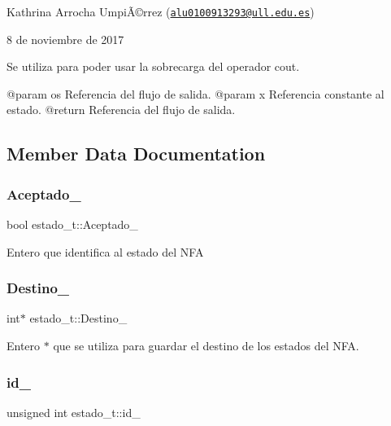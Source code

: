 Kathrina Arrocha UmpiÃ©rrez (\href{mailto:alu0100913293@ull.edu.es}{\tt alu0100913293@ull.\+edu.\+es})

8 de noviembre de 2017

Se utiliza para poder usar la sobrecarga del operador cout. \begin{DoxyVerb}  @param    os Referencia del flujo de salida. 
  @param    x Referencia constante al estado.
  @return   Referencia del flujo de salida.  \end{DoxyVerb}
 

\subsection{Member Data Documentation}
\mbox{\label{classestado__t_ada7ab9464df89cd55932c81d54a0a246}} 
\subsubsection{\texorpdfstring{Aceptado\+\_\+}{Aceptado\_}}
{\footnotesize\ttfamily bool estado\+\_\+t\+::\+Aceptado\+\_\+}

Entero que identifica al estado del N\+FA \mbox{\label{classestado__t_a2b1d0cb5028c3e687bc954c1dccb6fa5}} 
\subsubsection{\texorpdfstring{Destino\+\_\+}{Destino\_}}
{\footnotesize\ttfamily int$\ast$ estado\+\_\+t\+::\+Destino\+\_\+}

Entero $\ast$ que se utiliza para guardar el destino de los estados del N\+FA. \mbox{\label{classestado__t_aba266da7e77f2633dc7296babf9893c9}} 
\subsubsection{\texorpdfstring{id\+\_\+}{id\_}}
{\footnotesize\ttfamily unsigned int estado\+\_\+t\+::id\+\_\+}

